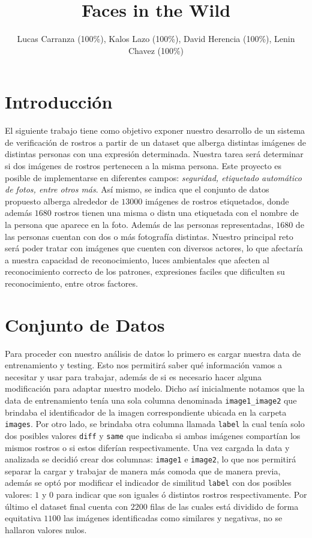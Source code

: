 \documentclass[conference]{IEEEtran}
\begin{document}
    \title{Faces in the Wild\\}
    \author{Lucas Carranza (100\%), Kalos Lazo (100\%), David Herencia (100\%), Lenin Chavez (100\%)}
    \maketitle

    \section{Introducción}
    El siguiente trabajo tiene como objetivo exponer nuestro desarrollo de un sistema de verificación de rostros a partir de un dataset que alberga distintas imágenes de distintas personas con una expresión determinada. Nuestra tarea será determinar si dos imágenes de rostros pertenecen a la misma persona. Este proyecto es posible de implementarse en diferentes campos: \textit{seguridad, etiquetado automático de fotos, entre otros más}. Así mismo, se indica que el conjunto de datos propuesto alberga alrededor de $13000$ imágenes de rostros etiquetados, donde además $1680$ rostros tienen una misma o distn una etiquetada con el nombre de la persona que aparece en la foto. Además de las personas representadas, $1680$ de las personas cuentan con dos o más fotografía distintas. Nuestro principal reto será poder tratar con imágenes que cuenten con diversos actores, lo que afectaría a nuestra capacidad de reconocimiento, luces ambientales que afecten al reconocimiento correcto de los patrones, expresiones faciles que dificulten su reconocimiento, entre otros factores.

    \section{Conjunto de Datos}
    Para proceder con nuestro análisis de datos lo primero es cargar nuestra data de entrenamiento y testing. Esto nos permitirá saber qué información vamos a necesitar y usar para trabajar, además de si es necesario hacer alguna modificación para adaptar nuestro modelo. Dicho así inicialmente notamos que la data de entrenamiento tenía una sola columna denominada \verb|image1_image2| que brindaba el identificador de la imagen correspondiente ubicada en la carpeta \verb|images|. Por otro lado, se brindaba otra columna llamada \verb|label| la cual tenía solo dos posibles valores \verb|diff| y \verb|same| que indicaba si ambas imágenes compartían los mismos rostros  o si estos diferían respectivamente. Una vez cargada la data y analizada se decidió crear dos columnas: \verb|image1| e \verb|image2|, lo que nos permitirá separar la cargar y trabajar de manera más comoda que de manera previa, además se optó por modificar el indicador de similitud \verb|label| con dos posibles valores: $1$ y $0$ para indicar que son iguales ó distintos rostros respectivamente. Por último el dataset final cuenta con $2200$ filas de las cuales está dividido de forma equitativa $1100$ las imágenes identificadas como similares y negativas, no se hallaron valores nulos.
\end{document}
